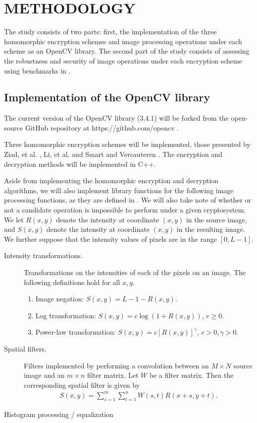 \chapter{METHODOLOGY}

The study consists of two parts: first, the implementation of the three homomorphic encryption schemes and image processing operations under each scheme as an OpenCV library. The second part of the study consists of assessing the robustness and security of image operations under each encryption scheme using benchmarks in \cite{ahmed_benchmark_2016}.

\section{Implementation of the OpenCV library}

The current version of the OpenCV library (3.4.1) will be forked from the open-source GitHub repository at https://github.com/opencv \cite{opencv_library}.

Three homomorphic encryption schemes will be implemented, those presented by Ziad, et al. \cite{ziad_cryptoimg:_2016}, Li, et al. \cite{li_elliptic_2012} and Smart and Vercauteren \cite{hutchison_fully_2010}. The encryption and decryption methods will be implemented in C++.

Aside from implementing the homomorphic encryption and decryption algorithms, we will also implement library functions for the following image processing functions, as they are defined in \cite{gonzalez_digital_2008}. We will also take note of whether or not a candidate operation is impossible to perform under a given cryptosystem.  We let $R(x,y)$ denote the intensity at coordinate $(x,y)$ in the source image, and $S(x,y)$ denote the intensity at coordinate $(x,y)$ in the resulting image. We further suppose that the intensity values of pixels are in the range $[0, L-1]$.
\begin{description}
	\item[Intensity transformations.] Transformations on the intensities of each of the pixels on an image. The following definitions hold for all $x,y$.
	\begin{enumerate}
		\item Image negation: $S(x,y) = L - 1 - R(x,y)$.
		\item Log transformation: $S(x,y) = c\log{(1 + R(x,y))}$, $c \geq 0$.
		\item Power-law transformation: $S(x,y) = c[R(x,y)]^\gamma$, $c > 0, \gamma > 0$.
	\end{enumerate}
	\item[Spatial filters.] Filters implemented by performing a convolution between an $M\times N$ source image and an $m\times n$ filter matrix. Let $W$ be a filter matrix. Then the corresponding spatial filter is given by
	\begin{align}
		S(x,y) = \sum_{s=1}^m{\sum_{t=1}^n{W(s,t)R(x+s,y+t)}}.
	\end{align}
	\item [Histogram processing / equalization]

\end{description}

